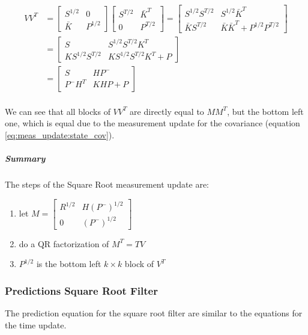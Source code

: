 \documentclass{article}
\begin{document}
\begin{equation}
\begin{split}
VV^T & = \begin{bmatrix} S^{1/2} & 0 \\ \bar{K} & P^{1/2} \end{bmatrix}\begin{bmatrix} S^{T/2} & \bar{K}^T \\ 0 & P^{T/2} \end{bmatrix} = \begin{bmatrix} S^{1/2}S^{T/2} & S^{1/2}\bar{K}^T \\ \bar{K}S^{T/2} & \bar{K}\bar{K}^T + P^{1/2}P^{T/2} \end{bmatrix}\\
 & = \begin{bmatrix} S & S^{1/2}S^{T/2}K^T \\ KS^{1/2}S^{T/2} & KS^{1/2}S^{T/2}K^T + P\end{bmatrix} \\
 & = \begin{bmatrix} S & HP^- \\ P^-H^T & KHP + P\end{bmatrix} \\
\end{split}
\end{equation}

We can see that all blocks of $VV^T$ are directly equal to $MM^T$, but the bottom left one, which is equal due to the measurement update for the covariance (equation \ref{eq:meas_update:state_cov}).

\subparagraph{Summary} The steps of the Square Root measurement update are:
\begin{enumerate}
 \item let $M = \begin{bmatrix} R^{1/2} & H(P^-)^{1/2} \\ 0 & (P^-)^{1/2} \end{bmatrix}$
 \item do a QR factorization of $M^T=TV$
 \item $P^{1/2}$ is the bottom left $k \times k$ block of $V^T$
\end{enumerate}

\subsubsection{Predictions Square Root Filter}

The prediction equation for the square root filter are similar to the equations for the time update.
\end{document}
